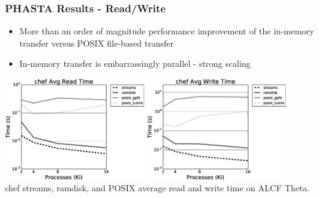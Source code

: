 \documentclass{beamer}
\begin{document}
\begin{frame}
  \frametitle{PHASTA Results - Read/Write}
  \begin{itemize}
    \item More than an order of magnitude performance improvement of the in-memory
      transfer versus POSIX file-based transfer
    \item In-memory transfer is embarrassingly parallel - strong scaling
  \end{itemize}
  \centering
  \includegraphics[width=0.45\textwidth]{../imp/results/phasta-dambreak/theta/chefreadavg.eps}
  \includegraphics[width=0.45\textwidth]{../imp/results/phasta-dambreak/theta/chefwriteavg.eps}\\
  chef streams, ramdisk, and POSIX average read and write time on ALCF Theta.
\end{frame}
\end{document}
